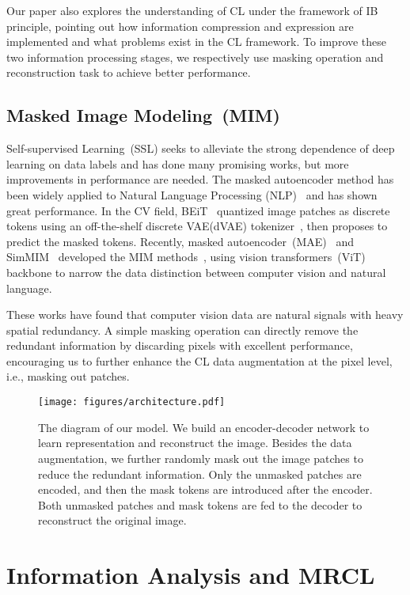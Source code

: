 \documentclass[10pt,twocolumn,letterpaper]{article}
\begin{document}
Our paper also explores the understanding of CL under the framework of IB principle, pointing out how information compression and expression are implemented and what problems exist in the CL framework. To improve these two information processing stages, we respectively use masking operation and reconstruction task to achieve better performance.

\subsection{Masked Image Modeling~(MIM)}
Self-supervised Learning~(SSL) seeks to alleviate the strong dependence of deep learning on data labels and has done many promising works, but more improvements in performance are needed. The masked autoencoder method has been widely applied to Natural Language Processing (NLP)~\cite{devlin2018bert,brown2020language} and has shown great performance. In the CV field, BEiT~\cite{bao2021beit} quantized image patches as discrete tokens using an off-the-shelf discrete VAE(dVAE) tokenizer~\cite{ramesh2021zero}, then proposes to predict the masked tokens. Recently, masked autoencoder~(MAE)~\cite{he2022masked} and SimMIM~\cite{xie2022simmim} developed the MIM methods~\cite{wei2022masked,bao2021beit,zhou2021ibot}, using vision transformers~(ViT)~\cite{dosovitskiy2020image} backbone to narrow the data distinction between computer vision and natural language. 

These works have found that computer vision data are natural signals with heavy spatial redundancy. A simple masking operation can directly remove the redundant information by discarding pixels with excellent performance, encouraging us to further enhance the CL data augmentation at the pixel level, i.e., masking out patches.

\begin{figure*}[ht!]
    \centering
    \texttt{[image: figures/architecture.pdf]}
    \caption{The diagram of our model. We build an encoder-decoder network to learn representation and reconstruct the image. Besides the data augmentation, we further randomly mask out the image patches to reduce the redundant information. Only the unmasked patches are encoded, and then the mask tokens are introduced after the encoder. Both unmasked patches and mask tokens are fed to the decoder to reconstruct the original image.} 
    \label{fig:architecture}
\end{figure*}
\section{Information Analysis and MRCL}
\end{document}
